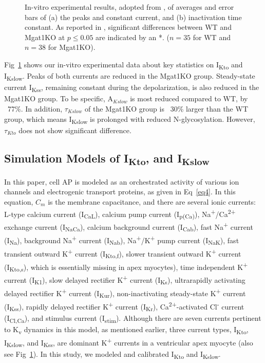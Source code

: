 \documentclass[10pt,letterpaper]{article}
\begin{document}
\begin{figure}[!ht]
    \centering
    \caption{In-vitro experimental results, adopted from \cite{ednie2019reduced}, of averages and error bars of (a) the peaks and constant current, and (b) inactivation time constant. As reported in \cite{ednie2019reduced}, significant differences between WT and Mgat1KO at $p \leq 0.05$ are indicated by an *. ($n=35$ for WT and $n=38$ for Mgat1KO).}
    \label{fig4}
\end{figure}

Fig~\ref{fig4} shows our in-vitro experimental data about key statistics on I\textsubscript{Kto} and I\textsubscript{Kslow}. Peaks of both currents are reduced in the Mgat1KO group. Steady-state current I\textsubscript{Kss}, remaining constant during the depolarization, is also reduced in the Mgat1KO group. To be specific, $\mathrm{A}_{Kslow}$ is most reduced compared to WT, by ~77\%. In addition, $\tau_{Kslow}$ of the Mgat1KO group is ~30\% larger than the WT group, which means I\textsubscript{Kslow} is prolonged with reduced N-glycosylation. However, $\tau_{Kto}$ does not show significant difference.

\subsection*{Simulation Models of I\textsubscript{Kto}, and I\textsubscript{Kslow}}
In this paper, cell AP is modeled as an orchestrated activity of various ion channels and electrogenic transport proteins, as given in Eq~\ref{eq4}. In this equation, $C_m$ is the membrane capacitance, and there are several ionic currents: L-type calcium current (I\textsubscript{CaL}), calcium pump current (I\textsubscript{p(Ca)}), Na\textsuperscript{+}/Ca\textsuperscript{2+} exchange current (I\textsubscript{NaCa}), calcium background current (I\textsubscript{Cab}), fast Na\textsuperscript{+} current (I\textsubscript{Na}), background Na\textsuperscript{+} current (I\textsubscript{Nab}), Na\textsuperscript{+}/K\textsuperscript{+} pump current (I\textsubscript{NaK}), fast transient outward K\textsuperscript{+} current (I\textsubscript{Kto,f}), slower transient outward K\textsuperscript{+} current (I\textsubscript{Kto,s}), which is essentially missing in apex myocytes), time independent K\textsuperscript{+} current (I\textsubscript{K1}), slow delayed rectifier K\textsuperscript{+} current (I\textsubscript{Ks}), ultrarapidly activating delayed rectifier K\textsuperscript{+} current (I\textsubscript{Kur}), non-inactivating steady-state K\textsuperscript{+} current (I\textsubscript{Kss}), rapidly delayed rectifier K\textsuperscript{+} current (I\textsubscript{Kr}), Ca\textsuperscript{2+}-activated Cl\textsuperscript{-} current (I\textsubscript{Cl,Ca}), and stimulus current (I\textsubscript{stim}). Although there are seven currents pertinent to K\textsubscript{v} dynamics in this model, as mentioned earlier, three current types, I\textsubscript{Kto}, I\textsubscript{Kslow}, and I\textsubscript{Kss}, are dominant K\textsuperscript{+} currents in a ventricular apex myocyte \cite{nerbonne2005molecular} (also see Fig~\ref{fig4}). In this study, we modeled and calibrated I\textsubscript{Kto} and I\textsubscript{Kslow}.
\end{document}
